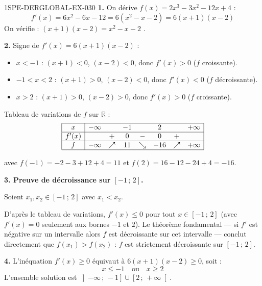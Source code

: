 \begin{corrige}{1SPE-DERGLOBAL-EX-030}
\textbf{1.} On dérive $f(x) = 2x^3 - 3x^2 - 12x + 4$ :
\[
f'(x) = 6x^2 - 6x - 12 = 6(x^2 - x - 2) = 6(x+1)(x-2)
\]
On vérifie : $(x+1)(x-2) = x^2 - x - 2$ \checkmark.

\textbf{2.} Signe de $f'(x) = 6(x+1)(x-2)$ :
\begin{itemize}
\item $x < -1$ : $(x+1) < 0$, $(x-2) < 0$, donc $f'(x) > 0$ ($f$ croissante).
\item $-1 < x < 2$ : $(x+1) > 0$, $(x-2) < 0$, donc $f'(x) < 0$ ($f$ décroissante).
\item $x > 2$ : $(x+1) > 0$, $(x-2) > 0$, donc $f'(x) > 0$ ($f$ croissante).
\end{itemize}

Tableau de variations de $f$ sur $\mathbb{R}$ :
\[
\begin{array}{|c|ccccccc|}
\hline
x & -\infty & & -1 & & 2 & & +\infty \\
\hline
f'(x) & & + & 0 & - & 0 & + & \\
\hline
f & -\infty & \nearrow & 11 & \searrow & -16 & \nearrow & +\infty \\
\hline
\end{array}
\]

avec $f(-1) = -2 - 3 + 12 + 4 = 11$ et $f(2) = 16 - 12 - 24 + 4 = -16$.

\textbf{3. Preuve de décroissance sur $[-1\,;\,2]$.}

Soient $x_1, x_2 \in [-1\,;\,2]$ avec $x_1 < x_2$.

D'après le tableau de variations, $f'(x) \leqslant 0$ pour tout $x \in [-1\,;\,2]$ (avec $f'(x) = 0$ seulement aux bornes $-1$ et $2$). Le théorème fondamental — si $f'$ est négative sur un intervalle alors $f$ est décroissante sur cet intervalle — conclut directement que $f(x_1) > f(x_2)$ : $f$ est strictement décroissante sur $[-1\,;\,2]$.

\textbf{4.} L'inéquation $f'(x) \geqslant 0$ équivaut à $6(x+1)(x-2) \geqslant 0$, soit :
\[
x \leqslant -1 \quad \text{ou} \quad x \geqslant 2
\]
L'ensemble solution est $\left]-\infty\,;\,-1\right] \cup \left[2\,;\,+\infty\right[$.
\end{corrige}
